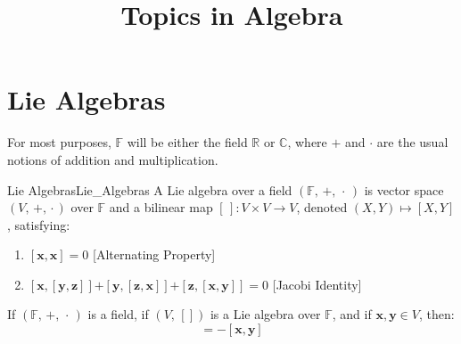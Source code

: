 \documentclass[crop=false,class=article]{standalone}                           %
\begin{document}
    \title{Topics in Algebra}
    \author{}
    \date{\vspace{-5ex}}
    \maketitle
    \section{Lie Algebras}
        For most purposes, $\mathbb{F}$ will be either the field $\mathbb{R}$
        or $\mathbb{C}$, where $+$ and $\cdot$ are the usual notions of
        addition and multiplication.
        \begin{fdefinition}{Lie Algebras}{Lie_Algebras}
            A Lie algebra over a field $(\mathbb{F},\,+,\,\cdot\,)$
            is vector space $(V,\,\boldsymbol{+},\,\boldsymbol{\cdot}\,)$
            over $\mathbb{F}$ and a bilinear map
            $[\,]:V\times{V}\rightarrow{V}$, denoted $(X,Y)\mapsto[X,Y]$,
            satisfying:
            \begin{enumerate}
                \item $[\mathbf{x},\mathbf{x}]=0$
                      \hfill[Alternating Property]
                \item $[\mathbf{x},[\mathbf{y},\mathbf{z}]]%
                       \boldsymbol{+}[\mathbf{y},[\mathbf{z},\mathbf{x}]]%
                       \boldsymbol{+}[\mathbf{z},[\mathbf{x},\mathbf{y}]]=0$
                      \hfill[Jacobi Identity]
            \end{enumerate}
        \end{fdefinition}
        \begin{theorem}
            \label{thm:Lie_Bracket_Anti_Commutes}%
            If $(\mathbb{F},\,+,\,\cdot\,)$ is a field, if $(V,\,[])$ is a
            Lie algebra over $\mathbb{F}$, and if
            $\mathbf{x},\mathbf{y}\in{V}$, then:
            \begin{equation}
                [\mathbf{x},\mathbf{y}]=\minus[\mathbf{x},\mathbf{y}]
            \end{equation}
        \end{theorem}
\end{document}
